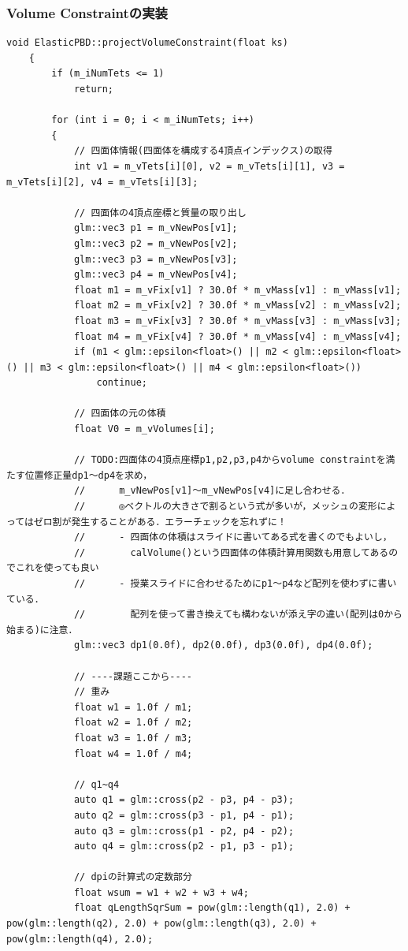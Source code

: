 \documentclass[a4paper,10pt,uplatex,dvipdfmx]{jsarticle}
\begin{document}
\subsubsection{Volume Constraintの実装}
\begin{lstlisting}[caption=pbd.cppのprojectVolumeConstraint関数]
	void ElasticPBD::projectVolumeConstraint(float ks)
	{
		if (m_iNumTets <= 1)
			return;
	
		for (int i = 0; i < m_iNumTets; i++)
		{
			// 四面体情報(四面体を構成する4頂点インデックス)の取得
			int v1 = m_vTets[i][0], v2 = m_vTets[i][1], v3 = m_vTets[i][2], v4 = m_vTets[i][3];
	
			// 四面体の4頂点座標と質量の取り出し
			glm::vec3 p1 = m_vNewPos[v1];
			glm::vec3 p2 = m_vNewPos[v2];
			glm::vec3 p3 = m_vNewPos[v3];
			glm::vec3 p4 = m_vNewPos[v4];
			float m1 = m_vFix[v1] ? 30.0f * m_vMass[v1] : m_vMass[v1];
			float m2 = m_vFix[v2] ? 30.0f * m_vMass[v2] : m_vMass[v2];
			float m3 = m_vFix[v3] ? 30.0f * m_vMass[v3] : m_vMass[v3];
			float m4 = m_vFix[v4] ? 30.0f * m_vMass[v4] : m_vMass[v4];
			if (m1 < glm::epsilon<float>() || m2 < glm::epsilon<float>() || m3 < glm::epsilon<float>() || m4 < glm::epsilon<float>())
				continue;
	
			// 四面体の元の体積
			float V0 = m_vVolumes[i];
	
			// TODO:四面体の4頂点座標p1,p2,p3,p4からvolume constraintを満たす位置修正量dp1～dp4を求め，
			//      m_vNewPos[v1]～m_vNewPos[v4]に足し合わせる．
			//      ◎ベクトルの大きさで割るという式が多いが，メッシュの変形によってはゼロ割が発生することがある．エラーチェックを忘れずに！
			//		- 四面体の体積はスライドに書いてある式を書くのでもよいし，
			//		  calVolume()という四面体の体積計算用関数も用意してあるのでこれを使っても良い
			//      - 授業スライドに合わせるためにp1～p4など配列を使わずに書いている．
			//		  配列を使って書き換えても構わないが添え字の違い(配列は0から始まる)に注意．
			glm::vec3 dp1(0.0f), dp2(0.0f), dp3(0.0f), dp4(0.0f);
	
			// ----課題ここから----
			// 重み
			float w1 = 1.0f / m1;
			float w2 = 1.0f / m2;
			float w3 = 1.0f / m3;
			float w4 = 1.0f / m4;
	
			// q1~q4
			auto q1 = glm::cross(p2 - p3, p4 - p3);
			auto q2 = glm::cross(p3 - p1, p4 - p1);
			auto q3 = glm::cross(p1 - p2, p4 - p2);
			auto q4 = glm::cross(p2 - p1, p3 - p1);
	
			// dpiの計算式の定数部分
			float wsum = w1 + w2 + w3 + w4;
			float qLengthSqrSum = pow(glm::length(q1), 2.0) + pow(glm::length(q2), 2.0) + pow(glm::length(q3), 2.0) + pow(glm::length(q4), 2.0);
	

\end{lstlisting}
\end{document}
